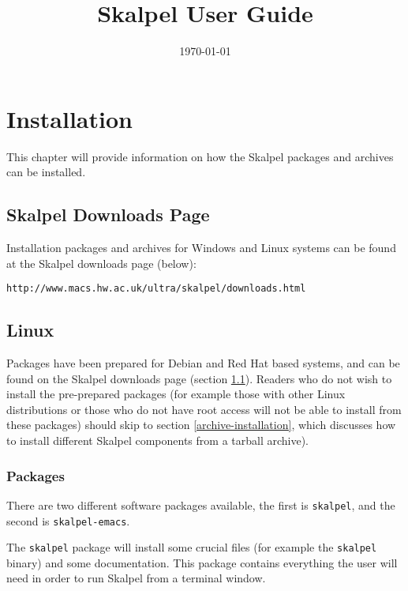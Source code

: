 \documentclass{report}
\title{Skalpel User Guide}
\date{\today}
\begin{document}
\maketitle
\vspace{110mm}

\newpage

\tableofcontents

\newpage

\chapter {Installation}
\label{skalpel-installation}

This chapter will provide information on how the Skalpel packages and
archives can be installed.

\section {Skalpel Downloads Page}
\label{skalpel-downloads-page}

Installation packages and archives for Windows and Linux systems can
be found at the Skalpel downloads page (below):

\begin{center}\texttt{http://www.macs.hw.ac.uk/ultra/skalpel/downloads.html}\end{center}

\section {Linux}

Packages have been prepared for Debian and Red Hat based systems, and
can be found on the Skalpel downloads page (section
\ref{skalpel-downloads-page}). Readers who do not wish to install the
pre-prepared packages (for example those with other Linux
distributions or those who do not have root access will not be able to
install from these packages) should skip to section \ref{archive-installation},
which discusses how to install different Skalpel components from a
tarball archive).

\subsection {Packages}

There are two different software packages available, the first is
\texttt{skalpel}, and the second is \texttt{skalpel-emacs}.

The \texttt{skalpel} package will install some crucial files (for
example the \texttt{skalpel} binary) and some documentation. This
package contains everything the user will need in order to run Skalpel
from a terminal window.
\end{document}
